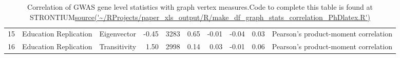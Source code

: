 \begin{table}[ht]
\begin{adjustbox}{max width=\textwidth}
\begin{tabular}{rllrlrrrrl}
  15 & Education Replication & Eigenvector & -0.45 & 3283 & 0.65 & -0.01 & -0.04 & 0.03 & Pearson's product-moment correlation \\ 
  16 & Education Replication & Transitivity & 1.50 & 2998 & 0.14 & 0.03 & -0.01 & 0.06 & Pearson's product-moment correlation \\ 
   \hline
\end{tabular}
\end{adjustbox}
\caption{Correlation of GWAS gene level statistics with graph vertex measures.Code to complete this table is found at STRONTIUM\url{source('~/RProjects/paper_xls_output/R/make_df_graph_stats_correlation_PhDlatex.R')}}
\label{Table:Correlation of GWAS gene level statistics with graph vertex measures}
\end{table}

